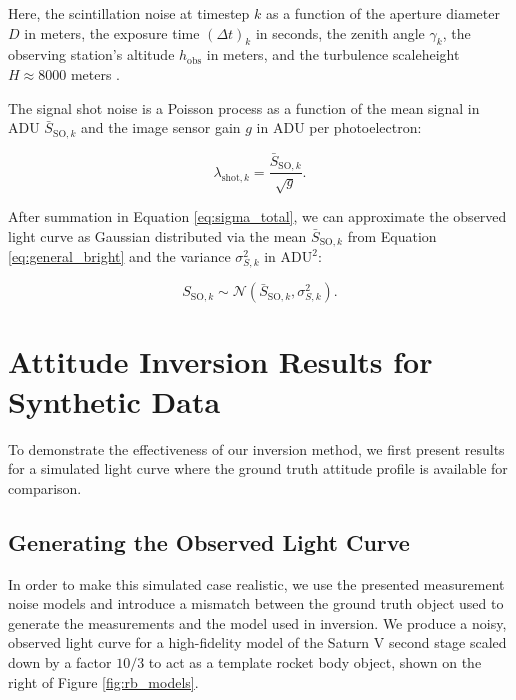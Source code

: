 \documentclass[a4paper,twocolumn]{spaceDebrisC} %
\newcommand{\figsmall}[0]{0.3\textwidth}
\begin{document}
Here, the scintillation noise at timestep $k$ as a function of the aperture diameter $D$ in meters, the exposure time $(\Delta t)_k$ in seconds, the zenith angle $\gamma_k$, the observing station's altitude $h_\text{obs}$ in meters, and the turbulence scaleheight $H\approx8000$ meters \cite{osborn2015}.

The signal shot noise is a Poisson process as a function of the mean signal in ADU $\bar{S}_{\text{SO},k}$ and the image sensor gain $g$ in ADU per photoelectron:

\begin{equation}
  \lambda_{\text{shot},k} = \frac{\bar{S}_{\text{SO},k}}{\sqrt{g}}.
\end{equation}

After summation in Equation \ref{eq:sigma_total}, we can approximate the observed light curve as Gaussian distributed via the mean $\bar{S}_{\text{SO},k}$ from Equation \ref{eq:general_bright} and the variance $\sigma^2_{S,k}$ in $\text{ADU}^2$:

\begin{equation} \label{eq:lc_dist}
 S_{\text{SO},k} \sim \mathcal{N}\left( \bar{S}_{\text{SO},k}, \sigma^2_{S,k} \right).
 \end{equation}

\section{Attitude Inversion Results for Synthetic Data} \label{sec:synth_results}

To demonstrate the effectiveness of our inversion method, we first present results for a simulated light curve where the ground truth attitude profile is available for comparison.

\subsection{Generating the Observed Light Curve}

In order to make this simulated case realistic, we use the presented measurement noise models and introduce a mismatch between the ground truth object used to generate the measurements and the model used in inversion. We produce a noisy, observed light curve for a high-fidelity model of the Saturn V second stage scaled down by a factor $10/3$ to act as a template rocket body object, shown on the right of Figure \ref{fig:rb_models}.

\end{document}
